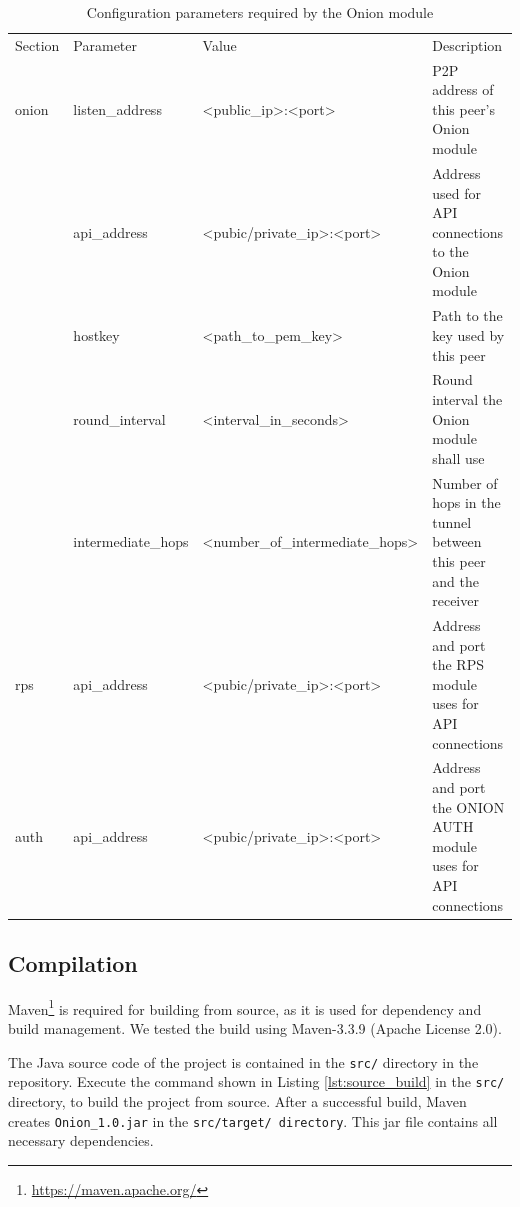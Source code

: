 \documentclass[paper=letter, fontsize=12pt]{article}
\begin{document}
\begin{table}[H]
    \centering
    \caption{Configuration parameters required by the Onion module}
    \label{tab:configuration_params}
    \begin{tabular}{l|l|l|p{5cm}}
        Section & Parameter             & Value                             & Description   \\ \Xhline{3\arrayrulewidth}
        onion   & listen\_address       & <public\_ip>:<port>               & P2P address of this peer's Onion module \\ \cline{2-4}
                & api\_address          & <pubic/private\_ip>:<port>        & Address used for API connections to the Onion module \\ \cline{2-4}
                & hostkey               & <path\_to\_pem\_key>              & Path to the key used by this peer \\ \cline{2-4}
                & round\_interval       & <interval\_in\_seconds>           & Round interval the Onion module shall use \\ \cline{2-4}
                & intermediate\_hops    & <number\_of\_intermediate\_hops>  & Number of hops in the tunnel between this peer and the receiver \\ \Xhline{1.5\arrayrulewidth}
        rps     & api\_address          & <pubic/private\_ip>:<port>        & Address and port the RPS module uses for API connections \\ \Xhline{1.5\arrayrulewidth}
        auth    & api\_address          & <pubic/private\_ip>:<port>        & Address and port the ONION AUTH module uses for API connections
    \end{tabular}
\end{table}


\subsection{Compilation} \label{sec:compilation}
Maven\footnote{\url{https://maven.apache.org/}} is required for building from source, as it is used for dependency and build management.
We tested the build using Maven-3.3.9 (Apache License 2.0).

The Java source code of the project is contained in the \texttt{src/} directory in the repository.
Execute the command shown in Listing \ref{lst:source_build} in the \texttt{src/} directory, to build the project from source.
After a successful build, Maven creates \texttt{Onion\_1.0.jar} in the \texttt{src/target/ directory}.
This jar file contains all necessary dependencies.
\end{document}

